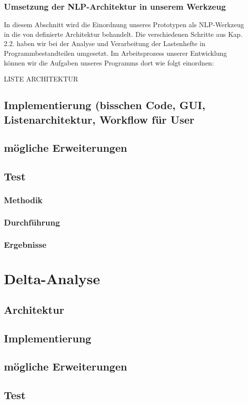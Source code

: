 \documentclass[12pt]{report}
\begin{document}
\subsection{Umsetzung der NLP-Architektur in unserem Werkzeug}
In diesem Abschnitt wird die Einordnung unseres Prototypen als NLP-Werkzeug in die von \cite{cop04} definierte Architektur behandelt. Die verschiedenen Schritte aus Kap. 2.2. haben wir bei der Analyse und Verarbeitung der Lastenhefte in Programmbestandteilen umgesetzt. Im Arbeitsprozess unserer Entwicklung können wir die Aufgaben unseres Programms dort wie folgt einordnen:

LISTE ARCHITEKTUR
\section{Implementierung (bisschen Code, GUI, Listenarchitektur, Workflow für User}
\section{mögliche Erweiterungen}
\section{Test}
\subsection{Methodik}
\subsection{Durchführung}
\subsection{Ergebnisse}
\chapter{Delta-Analyse}
\section{Architektur}
\section{Implementierung}
\section{mögliche Erweiterungen}
\section{Test}
\end{document}

